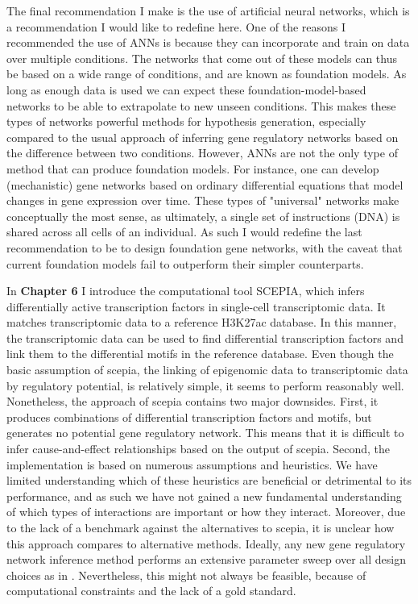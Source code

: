 The final recommendation I make is the use of artificial neural networks, which is a recommendation I would like to redefine here. One of the reasons I recommended the use of ANNs is because they can incorporate and train on data over multiple conditions. The networks that come out of these models can thus be based on a wide range of conditions, and are known as foundation models. As long as enough data is used we can expect these foundation-model-based networks to be able to extrapolate to new unseen conditions\cite{Schreiber2020_avocado}. This makes these types of networks powerful methods for hypothesis generation, especially compared to the usual approach of inferring gene regulatory networks based on the difference between two conditions. However, ANNs are not the only type of method that can produce foundation models. For instance, one can develop (mechanistic) gene networks based on ordinary differential equations that model changes in gene expression over time\cite{Ventre_2022}. These types of "universal" networks make conceptually the most sense, as ultimately, a single set of instructions (DNA) is shared across all cells of an individual. As such I would redefine the last recommendation to be to design foundation gene networks, with the caveat that current foundation models fail to outperform their simpler counterparts\cite{Kedzierska2023}.

In \textbf{Chapter 6} I introduce the computational tool SCEPIA, which infers differentially active transcription factors in single-cell transcriptomic data. It matches transcriptomic data to a reference H3K27ac database. In this manner, the transcriptomic data can be used to find differential transcription factors and link them to the differential motifs in the reference database. Even though the basic assumption of scepia, the linking of epigenomic data to transcriptomic data by regulatory potential\cite{Wang2016}, is relatively simple, it seems to perform reasonably well. Nonetheless, the approach of scepia contains two major downsides. First, it produces combinations of differential transcription factors and motifs, but generates no potential gene regulatory network. This means that it is difficult to infer cause-and-effect relationships based on the output of scepia. Second, the implementation is based on numerous assumptions and heuristics. We have limited understanding which of these heuristics are beneficial or detrimental to its performance, and as such we have not gained a new fundamental understanding of which types of interactions are important or how they interact. Moreover, due to the lack of a benchmark against the alternatives to scepia\cite{Aibar_2017,Dong2022}, it is unclear how this approach compares to alternative methods. Ideally, any new gene regulatory network inference method performs an extensive parameter sweep over all design choices as in \cite{Gschwind2023}. Nevertheless, this might not always be feasible, because of computational constraints and the lack of a gold standard.

